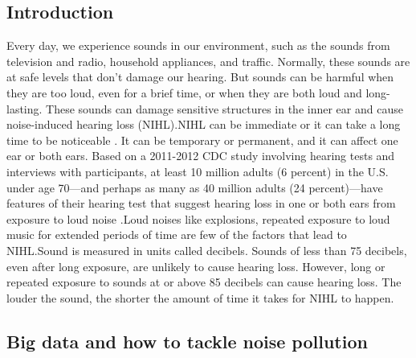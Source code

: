 \documentclass[sigconf]{acmart}
\begin{document}
\subsection{Introduction}
Every day, we experience sounds in our environment, such as the sounds from television and radio, household appliances, and traffic. Normally, these sounds are at safe levels that don’t damage our hearing. But sounds can be harmful when they are too loud, even for a brief time, or when they are both loud and long-lasting. These sounds can damage sensitive structures in the inner ear and cause noise-induced hearing loss (NIHL).NIHL can be immediate or it can take a long time to be noticeable \cite{NIDCD2017} . It can be temporary or permanent, and it can affect one ear or both ears. Based on a 2011-2012 CDC study involving hearing tests and interviews with participants, at least 10 million adults (6 percent) in the U.S. under age 70—and perhaps as many as 40 million adults (24 percent)—have features of their hearing test that suggest hearing loss in one or both ears from exposure to loud noise \cite{NIDCD2017}.Loud noises like explosions, repeated exposure to loud music for extended periods of time are few of the factors that lead to NIHL.Sound is measured in units called decibels. Sounds of less than 75 decibels, even after long exposure, are unlikely to cause hearing loss. However, long or repeated exposure to sounds at or above 85 decibels can cause hearing loss. The louder the sound, the shorter the amount of time it takes for NIHL to happen.

\subsection{Big data and how to tackle noise pollution}
\end{document}
